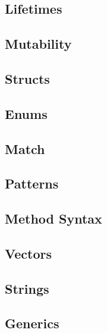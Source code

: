 \subsection{Lifetimes}
\label{sec:syntax_lifetimes}


\subsection{Mutability}
\label{sec:syntax_mutability}


\subsection{Structs}
\label{sec:syntax_structs}


\subsection{Enums}
\label{sec:syntax_enums}


\subsection{Match}
\label{sec:syntax_match}


\subsection{Patterns}
\label{sec:syntax_patterns}


\subsection{Method Syntax}
\label{sec:syntax_methodSyntax}


\subsection{Vectors}
\label{sec:syntax_vectors}


\subsection{Strings}
\label{sec:syntax_strings}


\subsection{Generics}
\label{sec:syntax_generics}


